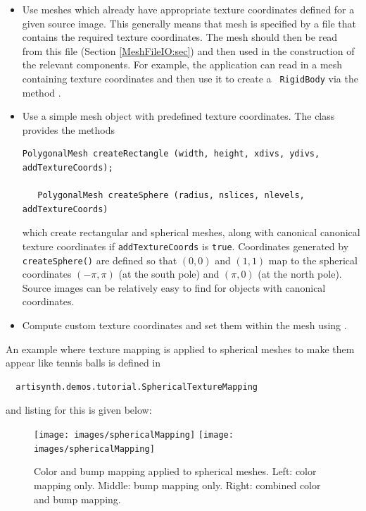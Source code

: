 \begin{itemize}

\item Use meshes which already have appropriate texture coordinates
defined for a given source image. This generally means that mesh is
specified by a file that contains the required texture coordinates.
The mesh should then be read from this file (Section
\ref{MeshFileIO:sec}) and then used in the construction of the
relevant components. For example, the application can read in a mesh
containing texture coordinates and then use it to create a {\tt
RigidBody} via the method
.

\item Use a simple mesh object with predefined
texture coordinates. The class 
provides the methods
%
\begin{lstlisting}[]
   PolygonalMesh createRectangle (width, height, xdivs, ydivs, addTextureCoords);
  
   PolygonalMesh createSphere (radius, nslices, nlevels, addTextureCoords)
\end{lstlisting}
%
which create rectangular and spherical meshes, along with canonical
canonical texture coordinates if {\tt addTextureCoords} is {\tt true}.
Coordinates generated by {\tt createSphere()} are defined so that
$(0,0)$ and $(1,1)$ map to the spherical coordinates $(-\pi,\pi)$ (at
the south pole) and $(\pi,0)$ (at the north pole). Source images can
be relatively easy to find for objects with canonical coordinates.

\item Compute custom texture coordinates and set them within the mesh
using .

\end{itemize}

An example where texture mapping is applied to spherical meshes to
make them appear like tennis balls is defined in
%
\begin{verbatim}
  artisynth.demos.tutorial.SphericalTextureMapping
\end{verbatim}
%
and listing for this is given below:

\begin{figure}[ht]
\begin{center}
\iflatexml
 \texttt{[image: images/sphericalMapping]}
\else
 \texttt{[image: images/sphericalMapping]}
\fi
\end{center}
\caption{Color and bump mapping applied to spherical meshes. Left:
color mapping only. Middle: bump mapping only. Right: combined color
and bump mapping.}
\label{sphericalMapping:fig}
\end{figure}

